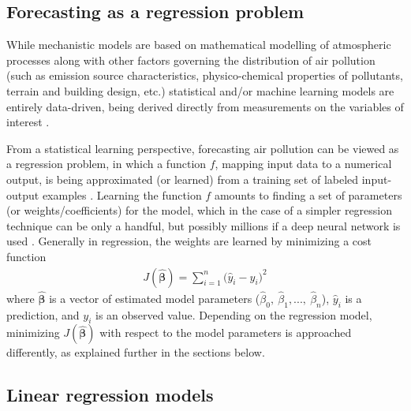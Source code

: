 \subsection{Forecasting as a regression problem}
\label{sec:forecasting}
While mechanistic models are based on mathematical modelling of atmospheric processes along with other factors governing the distribution of air pollution (such as emission source characteristics, physico-chemical properties of pollutants, terrain and building design, etc.) statistical and/or machine learning models are entirely data-driven, being derived directly from measurements on the variables of interest \cite{ElHarbawi2013}. 

From a statistical learning perspective, forecasting air pollution can be viewed as a regression problem, in which a function $f$, mapping input data to a numerical output, is being approximated (or learned) from a training set of labeled input-output examples \cite{smlbook}. Learning the function $f$ amounts to finding a set of parameters (or weights/coefficients) for the model, which in the case of a simpler regression technique can be only a handful, but possibly millions if a deep neural network is used \cite{LeCun2015}. Generally in regression, the weights are learned by minimizing a cost function
\begin{align}
J(\bm{\hat{\beta}}) = \sum_{i=1}^{n} \big(\hat{y}_i - y_i \big)^2
\label{eq:cost}
\end{align}
where $\bm{\hat{\beta}}$ is a vector of estimated model parameters ($\hat{\beta}_0, \: \hat{\beta}_1, ..., \: \hat{\beta}_n$), $\hat{y}_i$ is a prediction, and $y_i$ is an observed value\cite{smlbook}. 
Depending on the regression model, minimizing $J(\bm{\hat{\beta}})$ with respect to the model parameters is approached differently, as explained further in the sections below. 

\subsection{Linear regression models}

